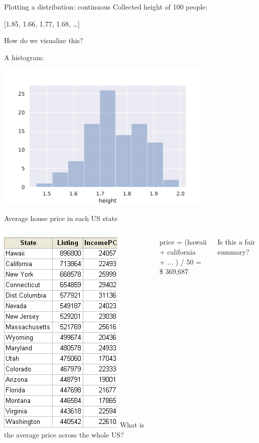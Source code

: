 \documentclass{beamer}
\begin{document}
\begin{frame}{Plotting a distribution: continuous}
Collected height of 100 people:

[1.85, 1.66, 1.77, 1.68, \dots]

\vspace{1em}
How do we visualize this?

\pause
A histogram:

\includegraphics[width=0.8\textwidth]{fig/histogram}
\end{frame}



\begin{frame}{Average house price in each US state}
\begin{columns}
\includegraphics[height=0.8\textheight]{fig/housepricesincome}
What is the average price across the whole US?

\pause\vspace{1em}
price = (hawaii + california \\
    + ... ) / 50 = \$ 369,687

\vspace{1em}
Is this a fair summary?
\end{columns}
\end{frame}
\end{document}
